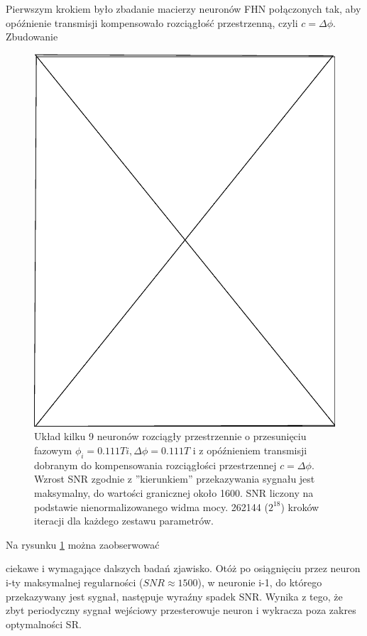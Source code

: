   Pierwszym krokiem było zbadanie macierzy neuronów FHN połączonych tak, aby opóźnienie transmisji kompensowało rozciągłość przestrzenną, czyli $c = \Delta \phi$. Zbudowanie

  \begin{figure}
    \includegraphics[width=120mm]{images/pending}
    \caption{Układ kilku 9 neuronów rozciągły przestrzennie o przesunięciu fazowym $\phi_i = 0.111 T i, \Delta \phi = 0.111 T$ i z opóźnieniem transmisji dobranym do kompensowania rozciągłości przestrzennej $c = \Delta \phi$. Wzrost SNR zgodnie z ''kierunkiem'' przekazywania sygnału jest maksymalny, do wartości granicznej około 1600. SNR liczony na podstawie nienormalizowanego widma mocy. 262144 ($2^{18}$) kroków iteracji dla każdego zestawu parametrów.}
    \label{fig:graphics:sim:2010_10_03}
  \end{figure}

  Na rysunku \ref{fig:graphics:sim:2010_10_03} można zaobserwować 

  ciekawe i wymagające dalszych badań zjawisko. Otóż po osiągnięciu przez neuron i-ty maksymalnej regularności ($SNR \approx 1500$), w neuronie i-1, do którego przekazywany jest sygnał, następuje wyraźny spadek SNR. Wynika z tego, że zbyt periodyczny sygnał wejściowy przesterowuje neuron i wykracza poza zakres optymalności SR.
  

